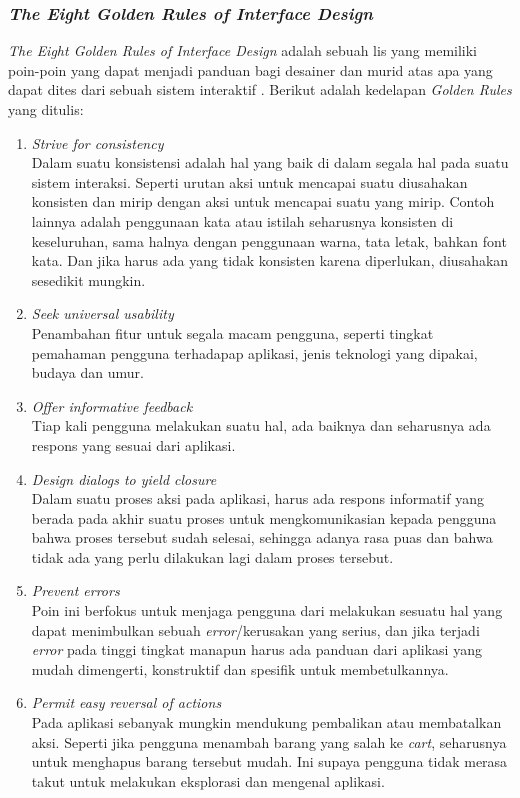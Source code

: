 \documentclass[a4paper]{article}
\newcommand{\subsubbab}[1]{%
    \subsubsection{#1}%
}
\begin{document}
\subsubbab{\textit{The Eight Golden Rules of Interface Design}}
\textit{The Eight Golden Rules of Interface Design} adalah sebuah lis yang memiliki poin-poin yang dapat menjadi panduan bagi desainer dan murid atas apa yang dapat dites dari sebuah sistem interaktif \autocite{Shneiderman_Plaisant_Cohen_Jacobs_Elmqvist_2018_eight_golden_rules}. Berikut adalah kedelapan \textit{Golden Rules} yang ditulis:
\begin{enumerate}
    \item \textit{Strive for consistency}\\
    Dalam suatu konsistensi adalah hal yang baik di dalam segala hal pada suatu sistem interaksi. Seperti urutan aksi untuk mencapai suatu diusahakan konsisten dan mirip dengan aksi untuk mencapai suatu yang mirip. Contoh lainnya adalah penggunaan kata atau istilah seharusnya konsisten di keseluruhan, sama halnya dengan penggunaan warna, tata letak, bahkan font kata. Dan jika harus ada yang tidak konsisten karena diperlukan, diusahakan sesedikit mungkin.
    \item \textit{Seek universal usability}\\
    Penambahan fitur untuk segala macam pengguna, seperti tingkat pemahaman pengguna terhadapap aplikasi, jenis teknologi yang dipakai, budaya dan umur.
    \item \textit{Offer informative feedback}\\
    Tiap kali pengguna melakukan suatu hal, ada baiknya dan seharusnya ada respons yang sesuai dari aplikasi.
    \item \textit{Design dialogs to yield closure}\\
    Dalam suatu proses aksi pada aplikasi, harus ada respons informatif yang berada pada akhir suatu proses untuk mengkomunikasian kepada pengguna bahwa proses tersebut sudah selesai, sehingga adanya rasa puas dan bahwa tidak ada yang perlu dilakukan lagi dalam proses tersebut.
    \item \textit{Prevent errors}\\
    Poin ini berfokus untuk menjaga pengguna dari melakukan sesuatu hal yang dapat menimbulkan sebuah \textit{error}/kerusakan yang serius, dan jika terjadi \textit{error} pada tinggi tingkat manapun harus ada panduan dari aplikasi yang mudah dimengerti, konstruktif dan spesifik untuk membetulkannya.
    \item \textit{Permit easy reversal of actions}\\
    Pada aplikasi sebanyak mungkin mendukung pembalikan atau membatalkan aksi. Seperti jika pengguna menambah barang yang salah ke \textit{cart}, seharusnya untuk menghapus barang tersebut mudah. Ini supaya pengguna tidak merasa takut untuk melakukan eksplorasi dan mengenal aplikasi.

\end{enumerate}
\end{document}
